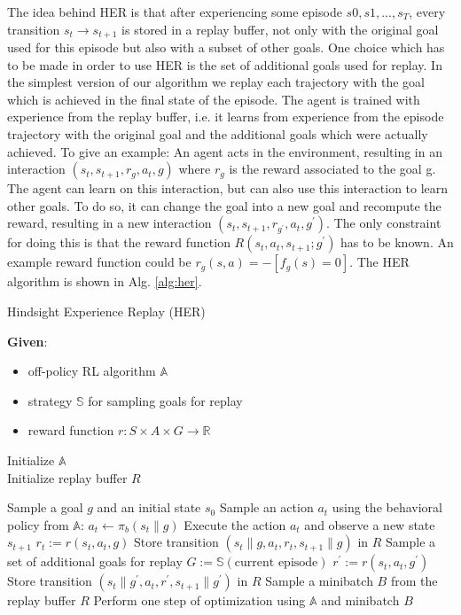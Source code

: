 \documentclass[conference]{IEEEtran}
\begin{document}
The idea behind HER is that after experiencing some episode $s0, s1, ..., s_T$, every transition $s_t \to s_{t+1}$ is stored in a replay buffer, not only with the original goal used for this episode but also with a subset of other goals. One choice which has to be made in order to use HER is the set of additional goals used for replay. In the simplest version of our algorithm we replay each trajectory with the goal which is achieved in the final state of the episode. The agent is trained with experience from the replay buffer, i.e. it learns from experience from the episode trajectory with the original goal and the additional goals which were actually achieved. To give an example: An agent acts in the environment, resulting in an interaction $(s_t, s_{t+1}, r_g, a_t, g)$ where $r_g$ is the reward associated to the goal g. The agent can learn on this interaction, but can also use this interaction to learn other goals. To do so, it can change the goal into a new goal and recompute the reward, resulting in a new interaction $(s_t, s_{t+1}, r_{g^{\prime}}, a_t, g^{\prime})$. The only constraint for doing this is that the reward function $R(s_t, a_t, s_{t+1}; g^{\prime})$ has to be known. An example reward function could be $r_g(s, a) = -[f_g(s) = 0]$. The HER algorithm is shown in Alg. \ref{alg:her}.
\begin{algorithm}
\caption{Hindsight Experience Replay (HER)}
\label{alg:her}
\textbf{Given}:
\begin{itemize}
    \item off-policy RL algorithm $\mathbb{A}$
    \item strategy $\mathbb{S}$ for sampling goals for replay
    \item reward function $r: S \times A \times G \to \mathbb{R}$
\end{itemize}
Initialize $\mathbb{A}$ \\
Initialize replay buffer $R$
\begin{algorithmic}
    \STATE Sample a goal $g$ and an initial state $s_0$
        \STATE Sample an action $a_t$ using the behavioral policy from $\mathbb{A}$: 
        \STATE \text{ }\text{ }\text{ }\text{ }$a_t \leftarrow \pi_b(s_{t}\|g)$
        \STATE Execute the action $a_t$ and observe a new state $s_{t+1}$
    \ENDFOR
        \STATE $r_t := r(s_t,a_t,g)$
        \STATE Store transition $(s_t\|g, a_t, r_t, s_{t+1}\|g)$ in $R$
        \STATE Sample a set of additional goals for replay $G:=\mathbb{S}(\text{current episode})$
            \STATE $r^{\prime} := r(s_t,a_t,g^{\prime})$
            \STATE Store transition $(s_t\|g^{\prime}, a_t, r^{\prime}, s_{t+1}\|g^{\prime})$ in $R$
        \ENDFOR
    \ENDFOR
        \STATE Sample a minibatch $B$ from the replay buffer $R$
        \STATE Perform one step of optimization using $\mathbb{A}$ and minibatch $B$
    \ENDFOR
\ENDFOR
\end{algorithmic}
\end{algorithm}
\end{document}
